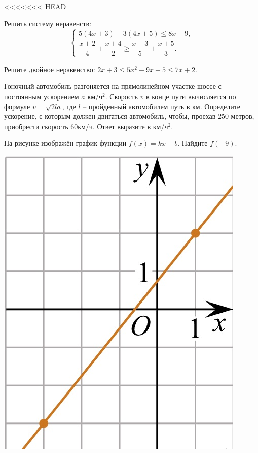 %	
%
%
\begin{class}[number=6]
	\begin{listofex}
<<<<<<< HEAD
	\item Решить систему неравенств:
	\[ \left\{
	\begin{array}{l}
		5(4x+3)-3(4x+5)\le8x+9,\\
		\dfrac{x+2}{4}+\dfrac{x+4}{2}\ge\dfrac{x+3}{5}+\dfrac{x+5}{3}.
	\end{array}
	\right. \]
	\item Решите двойное неравенство: \( 2x+3\le5x^2-9x+5\le7x+2 \).
	\item Гоночный автомобиль разгоняется на прямолинейном участке шоссе с постоянным ускорением \( a \) км/ч\( ^2 \). Скорость \( v \)  в конце пути вычисляется по формуле \( v=\sqrt{2la} \), где \( l \) – пройденный автомобилем путь в км. Определите ускорение, с которым должен двигаться автомобиль, чтобы, проехав \( 250 \) метров, приобрести скорость \( 60 \)км/ч. Ответ выразите в км/ч\( ^2 \).
	\item
	\begin{minipage}[t]{\bodywidth}
		На рисунке изображён график функции \(f(x)=kx+b\). Найдите \(f(-9)\).
	\end{minipage}
	\hspace{0.02\linewidth}
	\begin{minipage}[t]{\picwidth}
		\includegraphics[align=t, width=\textwidth]{pics/G101M4C4-1.jpg}

\end{minipage}
\end{listofex}
\end{class}
